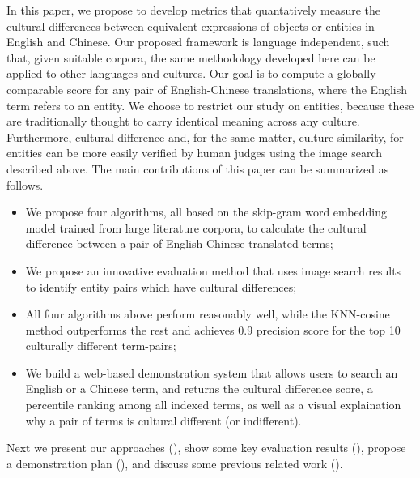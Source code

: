 In this paper, we propose to develop metrics
that quantatively measure the cultural differences between equivalent
expressions of objects or entities in English and Chinese. 
Our proposed framework is language independent, such that, 
given suitable corpora, the same methodology developed here can be
applied to other languages and cultures. Our goal is to compute a globally
comparable score for any pair of English-Chinese translations, where
the English term refers to an entity. We choose to restrict our
study on entities, 
 because these are traditionally thought to 
carry identical meaning across any culture. 
Furthermore, cultural 
difference and, for the same matter, culture similarity, for 
entities can be more easily verified by human judges using the image search described above. The main 
contributions of this paper can be summarized as follows.

\begin{itemize}
\item We propose four algorithms, all based on the skip-gram word 
embedding model trained from large literature corpora, 
to calculate the cultural difference between a pair
of English-Chinese translated terms;
\item We propose an innovative evaluation method that uses image search
results to identify entity pairs which have cultural differences;
\item All four algorithms above perform reasonably well, while the
KNN-cosine method outperforms the rest and achieves 0.9 precision score for
the top 10 culturally different term-pairs;
\item We build a web-based demonstration system that allows users to
search an English or a Chinese term, and returns the cultural difference
score, a percentile ranking among all indexed terms, as well as a
visual explaination why a pair of terms is cultural different (or 
indifferent).
\end{itemize}

Next we present our approaches (), 
show some key evaluation results (),
propose a demonstration plan (), and 
discuss some previous related work ().

